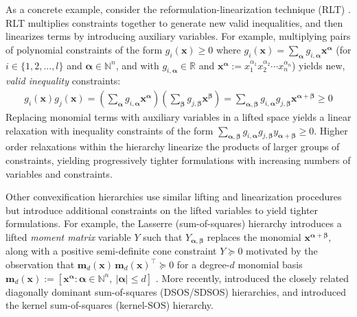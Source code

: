 \documentclass[10pt]{article} %
\theoremstyle{plain}
\theoremstyle{definition}
\theoremstyle{remark}
\begin{document}
As a concrete example, consider the reformulation-linearization technique (RLT) \citep{sherali2013reformulation}.
RLT multiplies constraints together to generate new valid inequalities, and then linearizes terms by introducing auxiliary variables.
For example, multiplying pairs of polynomial constraints of the form 
$g_i(\mathbf{x}) \geq 0$ where $g_i(\mathbf{x}) = \sum_{\bm{\alpha}} g_{i,\bm{\alpha}} \mathbf{x}^{\bm{\alpha}}$ 
(for $i \in \{1, 2, ..., l\}$ and $\bm{\alpha} \in \mathbb{N}^n$, and with $g_{i, \bm{\alpha}} \in \mathbb{R}$ and $\mathbf{x}^{\bm{\alpha}} := x_1^{\alpha_1} x_2^{\alpha_2} \cdots x_n^{\alpha_n}$)
yields new, \textit{valid inequality} constraints:
\begin{align*}
g_i(\mathbf{x}) g_j(\mathbf{x}) 
= (\sum_{\bm{\alpha}} g_{i,\bm{\alpha}} \mathbf{x}^{\bm{\alpha}} )(\sum_{\bm{\beta}} g_{j,\bm{\beta}} \mathbf{x}^{\bm{\beta}} )
= \sum_{\bm{\alpha}, \bm{\beta}} g_{i,\bm{\alpha}} g_{j,\bm{\beta}} \mathbf{x}^{\bm{\alpha} + \bm{\beta}} \geq 0 
\end{align*}
Replacing monomial terms with auxiliary variables in a lifted space yields a linear relaxation with inequality constraints of the form
$
\sum_{\bm{\alpha}, \bm{\beta}} g_{i, \bm{\alpha}} g_{j, \bm{\beta}} y_{\bm{\alpha}+\bm{\beta}} \geq 0.
$
Higher order relaxations within the hierarchy linearize the products of larger groups of constraints, yielding progressively tighter formulations with increasing numbers of variables and constraints. 

Other convexification hierarchies use similar lifting and linearization procedures but introduce additional constraints on the lifted variables to yield tighter formulations. For example, the Lasserre (sum-of-squares) hierarchy introduces a lifted \textit{moment matrix} variable $Y$ such that $Y_{\bm{\alpha}, \bm{\beta}}$ replaces the monomial $\mathbf{x}^{\bm{\alpha} + \bm{\beta}}$, along with a positive semi-definite cone constraint $Y \succeq 0$ motivated by the observation that $\mathbf{m}_d(\mathbf{x}) \, \mathbf{m}_d(\mathbf{x})^\top \succeq 0$ for a degree-$d$ monomial basis $\mathbf{m}_d(\mathbf{x}) := [\mathbf{x}^{\bm{\alpha}}: \bm{\alpha} \in \mathbb{N}^n,~ |\bm{\alpha}|\leq d]$ \citep{lasserre2001global}. More recently, \citet{ahmadi2016some} introduced the closely related diagonally dominant sum-of-squares (DSOS/SDSOS) hierarchies, and \citet{rudi2020finding} introduced the kernel sum-of-squares (kernel-SOS) hierarchy.
\end{document}
